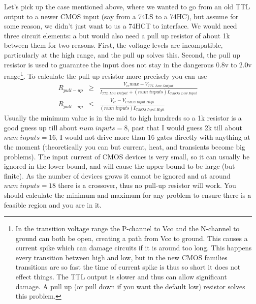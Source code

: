 Let's pick up the case mentioned above, where we wanted to go from an old TTL output to a newer CMOS input (say from a 74LS to a 74HC), but assume for some reason, we didn't just want to us a 74HCT to interface.  We would need three circuit elements: a but would also need a pull up resistor of about 1k between them for two reasons.  First, the voltage levels are incompatible, particularly at the high range, and the pull up solves this.  Second, the pull up resistor is used to guarantee the input does not stay in the dangerous 0.8v to 2.0v range\footnote{In the transition voltage range the P-channel to Vcc and the N-channel to ground can both be open, creating a path from Vcc to ground.  This causes a current spike which can damage circuits if it is around too long.  This happens every transition between high and low, but in the new CMOS families transitions are so fast the time of current spike is thus so short it does not effect things. The TTL output is slower and thus can allow significant damage.  A pull up (or pull down if you want the default low) resistor solves this problem.}.  To calculate the pull-up resistor more precisely you can use
\begin{eqnarray}
R_{pull-up} &\geq& \frac{V_{cc}max-V_{TTL\; Low\; Output}}{I_{TTL\; Low\; Output} + (num\; inputs)I_{CMOS\; Low\; Input}}\label{eq-resistor-pull-up-min}\\
R_{pull-up} &\leq& \frac{V_{cc}-V_{CMOS\; Input\; High}}{(num\; inputs)I_{CMOS\; Input\; High}}\label{eq-resistor-pull-up-max}
\end{eqnarray}
Usually the minimum value is in the mid to high hundreds so a 1k resistor is a good guess up till about $num\; inputs=8$, past that I would guess 2k till about $num\; inputs=16$, I would not drive more than 16 gates directly with anything at the moment (theoretically you can but current, heat, and transients become big problems).  The input current of CMOS devices is very small, so it can usually be ignored in the lower bound, and will cause the upper bound to be large (but finite).  As the number of devices grows it cannot be ignored and at around $num\; inputs=18$ there is a crossover, thus no pull-up resistor will work.  You should calculate the minimum and maximum for any problem to ensure there is a feasible region and you are in it.

